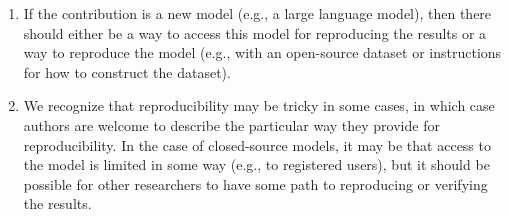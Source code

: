 \begin{enumerate}
\begin{itemize}
\begin{enumerate}
    \item If the contribution is a new model (e.g., a large language model), then there should either be a way to access this model for reproducing the results or a way to reproduce the model (e.g., with an open-source dataset or instructions for how to construct the dataset).
    \item We recognize that reproducibility may be tricky in some cases, in which case authors are welcome to describe the particular way they provide for reproducibility. In the case of closed-source models, it may be that access to the model is limited in some way (e.g., to registered users), but it should be possible for other researchers to have some path to reproducing or verifying the results.
    \end{enumerate}
  \end{itemize}



\end{enumerate}
